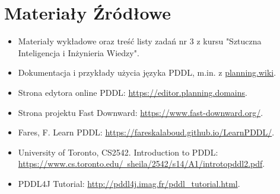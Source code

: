 \documentclass[12pt,a4paper]{article}
\begin{document}
\section*{Materiały Źródłowe}
\begin{itemize}
    \item Materiały wykładowe oraz treść listy zadań nr 3 z kursu "Sztuczna Inteligencja i Inżynieria Wiedzy".
    \item Dokumentacja i przykłady użycia języka PDDL, m.in. z \href{https://planning.wiki/ref/pddl/domain}{planning.wiki}.
    \item Strona edytora online PDDL: \href{https://editor.planning.domains}{https://editor.planning.domains}.
    \item Strona projektu Fast Downward: \href{https://www.fast-downward.org/}{https://www.fast-downward.org/}.
    \item Fares, F. Learn PDDL: \href{https://fareskalaboud.github.io/LearnPDDL/}{https://fareskalaboud.github.io/LearnPDDL/}.
    \item University of Toronto, CS2542. Introduction to PDDL: \href{https://www.cs.toronto.edu/~sheila/2542/s14/A1/introtopddl2.pdf}{https://www.cs.toronto.edu/~sheila/2542/s14/A1/introtopddl2.pdf}.
    \item PDDL4J Tutorial: \href{http://pddl4j.imag.fr/pddl_tutorial.html}{http://pddl4j.imag.fr/pddl\_tutorial.html}.
\end{itemize}
\end{document}
